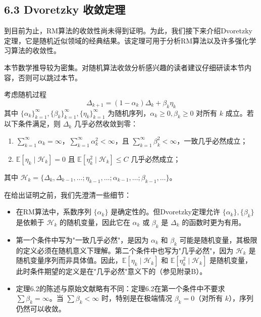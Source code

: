 \documentclass[UTF8]{article}
\begin{document}
\subsection*{6.3 Dvoretzky 收敛定理}

到目前为止，RM算法的收敛性尚未得到证明。为此，我们接下来介绍Dvoretzky定理，它是随机近似领域的经典结果。该定理可用于分析RM算法以及许多强化学习算法的收敛性。

\begin{remarkbox}
    本节数学推导较为密集。对随机算法收敛分析感兴趣的读者建议仔细研读本节内容，否则可以跳过本节。
\end{remarkbox}

\begin{theorembox}[6.2 Dvoretzky 定理]
    考虑随机过程
    \begin{equation}
    \label{eq:dvoretzky}
    \Delta_{k+1} = (1 - \alpha_k)\Delta_k + \beta_k \eta_k
    \end{equation}
    其中 $\{\alpha_k\}_{k=1}^{\infty}, \{\beta_k\}_{k=1}^{\infty}, \{\eta_k\}_{k=1}^{\infty}$ 为随机序列，$\alpha_k \geq 0, \beta_k \geq 0$ 对所有 $k$ 成立。若以下条件满足，则 $\Delta_k$ 几乎必然收敛到零：
    \begin{enumerate}
        \item $\displaystyle\sum_{k=1}^{\infty} \alpha_k = \infty$，$\displaystyle\sum_{k=1}^{\infty} \alpha_k^2 < \infty$，且 $\displaystyle\sum_{k=1}^{\infty} \beta_k^2 < \infty$，一致几乎必然成立；
        \item $\mathbb{E}[\eta_k \mid \mathcal{H}_k] = 0$ 且 $\mathbb{E}[\eta_k^2 \mid \mathcal{H}_k] \leq C$ 几乎必然成立；
    \end{enumerate}
    其中 $\mathcal{H}_k = \{\Delta_k, \Delta_{k-1}, \dots; \eta_{k-1}, \dots; \alpha_{k-1}, \dots; \beta_{k-1}, \dots\}$。
\end{theorembox}

在给出证明之前，我们先澄清一些细节：
\begin{itemize}
    \item 在RM算法中，系数序列 $\{\alpha_k\}$ 是确定性的。但Dvoretzky定理允许 $\{\alpha_k\}, \{\beta_k\}$ 是依赖于 $\mathcal{H}_k$ 的随机变量，因此它在 $\alpha_k$ 或 $\beta_k$ 是 $\Delta_k$ 的函数时更为有用。
    \item 第一个条件中写为"一致几乎必然"，是因为 $\alpha_k$ 和 $\beta_k$ 可能是随机变量，其极限的定义必须在随机意义下理解。第二个条件中也写为"几乎必然"，因为 $\mathcal{H}_k$ 是随机变量序列而非具体值。因此，$\mathbb{E}[\eta_k \mid \mathcal{H}_k]$ 和 $\mathbb{E}[\eta_k^2 \mid \mathcal{H}_k]$ 是随机变量，此时条件期望的定义是在"几乎必然"意义下的（参见附录B）。
    \item 定理6.2的陈述与原始文献略有不同：定理6.2在第一个条件中不要求 $\sum \beta_k = \infty$。当 $\sum \beta_k < \infty$ 时，特别是在极端情况 $\beta_k = 0$（对所有 $k$），序列仍然可以收敛。
\end{itemize}
\end{document}
